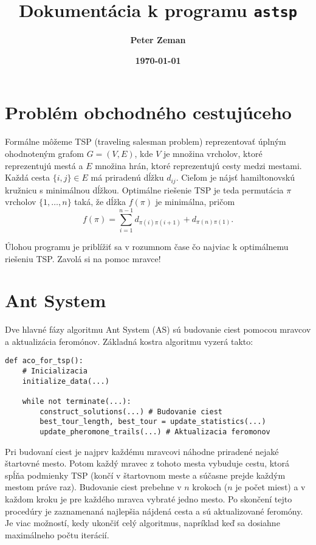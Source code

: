 \documentclass[12pt,a4paper]{article}
\title{\bf Dokumentácia k programu \texttt{astsp}}
\date{\bf \today}
\author{\bf Peter Zeman}
\begin{document}
\maketitle

\section*{Problém obchodného cestujúceho}

Formálne môžeme TSP (traveling salesman problem) reprezentovať úplným
ohodnoteným grafom $G = (V, E)$, kde $V$ je množina vrcholov, ktoré reprezentujú
mestá a $E$ množina hrán, ktoré reprezentujú cesty medzi mestami. Každá cesta
$\{i,j\}\in E$ má priradenú dĺžku $d_{ij}$. Cieľom je nájsť hamiltonovskú
kružnicu s minimálnou dĺžkou. Optimálne riešenie TSP je teda permutácia $\pi$
vrcholov $\{1,\dots,n\}$ taká, že dĺžka $f(\pi)$ je minimálna, pričom $$f(\pi) =
\sum_{i=1}^{n-1}d_{\pi(i)\pi(i+1)} + d_{\pi(n)\pi(1)}.$$

Úlohou programu je priblížiť sa v rozumnom čase čo najviac k optimálnemu riešeniu TSP. Zavolá si na pomoc mravce!

\section*{Ant System}

Dve hlavné fázy algoritmu Ant System (AS) sú budovanie ciest pomocou mravcov a aktualizácia feromónov. Základná kostra
algoritmu vyzerá takto:

\begin{verbatim}
def aco_for_tsp():
    # Inicializacia
    initialize_data(...)

    while not terminate(...):
        construct_solutions(...) # Budovanie ciest
        best_tour_length, best_tour = update_statistics(...)
        update_pheromone_trails(...) # Aktualizacia feromonov
\end{verbatim}

Pri budovaní ciest je najprv každému mravcovi náhodne priradené nejaké štartovné mesto. Potom každý mravec z tohoto
mesta vybuduje cestu, ktorá spĺňa podmienky TSP (končí v štartovnom meste a súčasne prejde každým mestom práve raz).
Budovanie ciest prebehne v $n$ krokoch ($n$ je počet miest) a v každom kroku je pre každého mravca vybraté jedno mesto.
Po skončení tejto procedúry je zaznamenaná najlepšia nájdená cesta a sú aktualizované feromóny. Je viac možností, kedy
ukončiť celý algoritmus, napríklad keď sa dosiahne maximálneho počtu iterácií.
\end{document}
